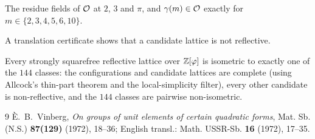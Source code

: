 \begin{theorem}\label{thm:residues}
\notready
{}
The residue fields of $\mathcal{O}$ at $2$, $3$ and $\pi$, and $\gamma(m)\in\mathcal{O}$ exactly for
$m\in\{2,3,4,5,6,10\}$.
\end{theorem}

\begin{theorem}\label{thm:nonrefl}
\notready
{}
A translation certificate shows that a candidate lattice is not reflective.
\end{theorem}

\begin{theorem}\label{thm:classification}
\notready
{}
Every strongly squarefree reflective lattice over $\mathbb{Z}[\varphi]$ is isometric to exactly one of
the $144$ classes: the configurations and candidate lattices are complete (using Allcock's
thin-part theorem and the local-simplicity filter), every other candidate is
non-reflective, and the $144$ classes are pairwise non-isometric.
\end{theorem}

\begin{thebibliography}{9}
 \`E.~B.~Vinberg, \emph{On groups of unit elements of certain quadratic
forms}, Mat. Sb. (N.S.) \textbf{87(129)} (1972), 18--36; English transl.: Math. USSR-Sb.
\textbf{16} (1972), 17--35.
\end{thebibliography}
